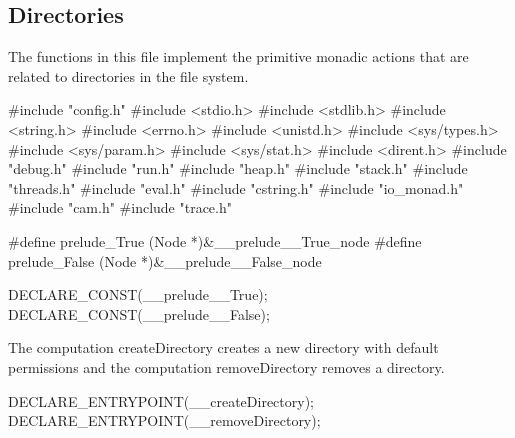 %
%
\subsection{Directories}
The functions in this file implement the primitive monadic actions
that are related to directories in the file system.

\nwenddocs{}\endmoddef\nwstartdeflinemarkup{}\nwenddeflinemarkup
#include "config.h"
#include <stdio.h>
#include <stdlib.h>
#include <string.h>
#include <errno.h>
#include <unistd.h>
#include <sys/types.h>
#include <sys/param.h>
#include <sys/stat.h>
#include <dirent.h>
#include "debug.h"
#include "run.h"
#include "heap.h"
#include "stack.h"
#include "threads.h"
#include "eval.h"
#include "cstring.h"
#include "io_monad.h"
#include "cam.h"
#include "trace.h"

#define prelude_True  (Node *)&__prelude__True_node
#define prelude_False (Node *)&__prelude__False_node

DECLARE_CONST(__prelude__True);
DECLARE_CONST(__prelude__False);

\nwendcode{}\nwdocspar
The computation {\Tt{}createDirectory\nwendquote} creates a new directory with
default permissions and the computation {\Tt{}removeDirectory\nwendquote} removes a
directory.

\nwenddocs{}\plusendmoddef\nwstartdeflinemarkup{}\nwenddeflinemarkup
DECLARE_ENTRYPOINT(__createDirectory);
DECLARE_ENTRYPOINT(__removeDirectory);

